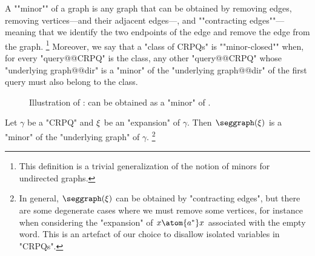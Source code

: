 A \AP""minor"" of a graph is any graph that can be obtained by removing
edges, removing vertices---and their adjacent edges---, and \AP""contracting edges""---meaning that we identify the two endpoints of the edge and remove the edge from the graph.%
\footnote{This definition is a trivial generalization of the notion of minors for undirected graphs.} Moreover, we say that a "class of CRPQs" is ""minor-closed"" when, for every
"query@@CRPQ" is the class, any other "query@@CRPQ" whose "underlying graph@@dir" 
is a "minor" of the "underlying graph@@dir" of the first query must also
belong to the class.

\begin{figure}
	\centering
	\hfill
	\hfill
	\caption{%
	\AP\label{fig:seggraph-of-expansion}
		Illustration of :
		 can be obtained as a "minor" of 
		.
	}
\end{figure}

\begin{proposition}
	\AP\label{prop:seggraph-of-expansion}
	Let $\gamma$ be a "CRPQ" and $\xi$ be an "expansion" of $\gamma$.
	Then $\seggraph(\anexpansion)$ is a "minor" of
	the "underlying graph" of $\gamma$.%
	\footnote{In general, $\seggraph(\anexpansion)$
	can be obtained by "contracting edges", but there are some degenerate cases where we must
	remove some vertices, for instance when considering the "expansion" of $x \atom{a^*} x$
	associated with the empty word. This is an artefact of our choice to disallow isolated variables
	in "CRPQs".}
\end{proposition}

